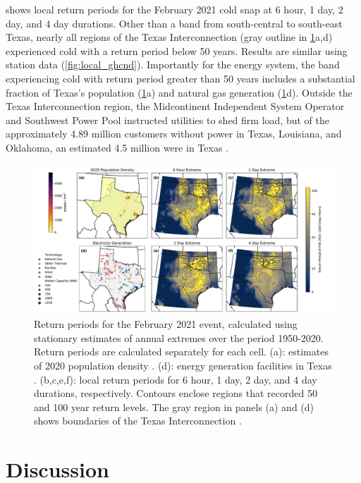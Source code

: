 \documentclass[12pt]{iopart}
\begin{document}
 shows local return periods for the February 2021 cold snap at 6 hour, 1 day, 2 day, and 4 day durations.
Other than a band from south-central to south-east Texas, nearly all regions of the Texas Interconnection (gray outline in \cref{fig:local_era5}a,d) experienced cold with a return period below 50 years.
Results are similar using station data (\cref{fig:local_ghcnd}).
Importantly for the energy system, the band experiencing cold with return period greater than 50 years includes a substantial fraction of Texas’s population (\cref{fig:local_era5}a) and natural gas generation (\cref{fig:local_era5}d).
Outside the Texas Interconnection region, the Midcontinent Independent System Operator and Southwest Power Pool instructed utilities to shed firm load, but of the approximately 4.89 million customers without power in Texas, Louisiana, and Oklahoma, an estimated 4.5 million were in Texas \cite{ceser_winterupdate:2021}.

\begin{figure}
  \centering
  \includegraphics[width=\textwidth]{local_rt_era5.pdf}
  \caption{
    Return periods for the February 2021 event, calculated using stationary estimates of annual extremes over the period 1950-2020.
    Return periods are calculated separately for each cell.
    (a): estimates of 2020 population density \cite{ciesin_gpwv4:2016}.
    (d): energy generation facilities in Texas \cite{useia_generators:2021}.
    (b,c,e,f): local return periods for 6 hour, 1 day, 2 day, and 4 day durations, respectively.
    Contours enclose regions that recorded 50 and 100 year return levels.
    The gray region in panels (a) and (d) shows boundaries of the Texas Interconnection \cite{useia_regions:2021}.
  }\label{fig:local_era5}
\end{figure}

\section{Discussion}
\end{document}
